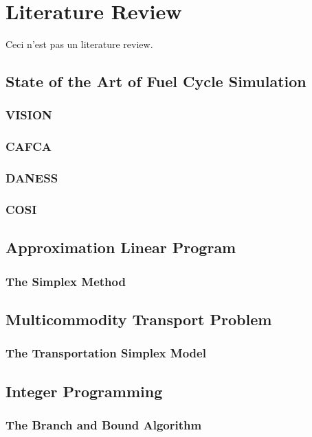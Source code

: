 \chapter{Literature Review}\label{ch:litreview}

Ceci n'est pas un literature review. 

\section{State of the Art of Fuel Cycle Simulation}\label{sec:simulators}

\subsection{VISION}
\subsection{CAFCA}
\subsection{DANESS}
\subsection{COSI}

\section{Approximation Linear Program}

\subsection{The Simplex Method}

\section{Multicommodity Transport Problem}\label{sec:MTP}

\subsection{The Transportation Simplex Model}\label{sec:trans-simplex}

\section{Integer Programming}

\subsection{The Branch and Bound Algorithm}\label{sec:bnb}
